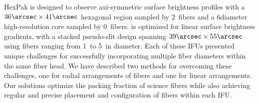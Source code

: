 HexPak is designed to observe axi-symmetric surface brightness profiles with a
$36\arcsec\times41\arcsec$ hexagonal region sampled by 2\ fibers and a
6\arcsec diameter high-resolution core sampled by 0\ fibers.  \GP
is optimized for linear surface brightness gradients, with a stacked
pseudo-slit design spanning $39\arcsec\times55\arcsec$ using fibers ranging
from 1\ to 5\ in diameter.  Each of these IFUs presented
unique challenges for successfully incorporating multiple fiber diameters
within the same fiber head.  We have described two methods for overcoming
these challenges, one for radial arrangements of fibers and one for linear
arrangements.  Our solutions optimize the packing fraction of science fibers
while also achieving regular and precise placement and configuration of fibers
within each IFU.

\clearpage
{}



